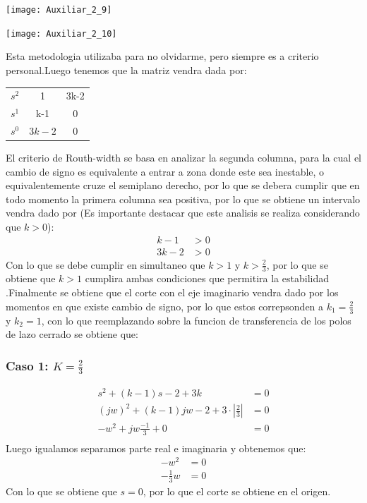 \documentclass[
  11pt,
  letterpaper,
   addpoints,
   answers
  ]{exam}
\begin{document}
\begin{questions}
\begin{solution}
\begin{center}
  \end{center}
  \begin{center}
    \texttt{[image: Auxiliar\_2\_9]}
  \end{center}
  \begin{center}
    \texttt{[image: Auxiliar\_2\_10]}
  \end{center}
Esta metodologia utilizaba para no olvidarme, pero siempre es a criterio personal.Luego tenemos que la matriz vendra dada por:
\begin{center}
    \begin{tabular}{|c|cc|}
        \hline
        $s^{2}$ & 1 & 3k-2\\
        $s^{1}$ & k-1 & 0\\
        $s^{0}$ & $3k-2$ & 0\\
        \hline
    \end{tabular}
\end{center}
El criterio de Routh-width se basa en analizar la segunda columna, para la cual el cambio de signo es equivalente a entrar a zona donde este sea inestable, o equivalentemente cruze el semiplano derecho, por lo que se debera cumplir que en todo momento la primera columna sea positiva, por lo que se obtiene un intervalo vendra dado por (Es importante destacar que este analisis se realiza considerando que $k>0$):
\begin{align}
    k-1 &> 0\\
    3k-2 &> 0
\end{align}
Con lo que se debe cumplir en simultaneo que $k>1$ y $k>\frac{2}{3}$, por lo que se obtiene que $k>1$ cumplira ambas condiciones que permitira la estabilidad .Finalmente se obtiene que el corte con el eje imaginario vendra dado por los momentos en que existe cambio de signo, por lo que estos correpsonden a $k_{1} = \frac{2}{3}$ y $k_{2}=1$, con lo que reemplazando sobre la funcion de transferencia de los polos de lazo cerrado se obtiene que:
\subsubsection*{Caso 1: $K=\frac{2}{3}$}
\begin{align}
    s^{2}+(k-1)s-2+3k &= 0\\
    (jw)^{2}+(k-1)jw-2+3\cdot \left|\frac{2}{3}\right| &= 0\\
    -w^{2}+jw\frac{-1}{3} +0 &= 0\\
\end{align}
Luego igualamos separamos parte real e imaginaria y obtenemos que:
\begin{align}
    -w^{2} &= 0\\
    -\frac{1}{3}w &= 0
\end{align}
Con lo que se obtiene que $s=0$, por lo que el corte se obtiene en el origen.

\end{solution}
\end{questions}
\end{document}
